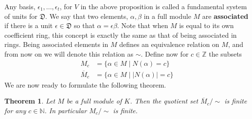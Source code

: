 \documentclass{article}
\newtheorem{theorem}{Theorem}[section]
\newcommand{\mfrak}[1]{\mathfrak{#1}}
\newcommand{\mbb}[1]{\mathbb{#1}}
\numberwithin{equation}{section}
\begin{document}
Any basis, $\epsilon_1, ..., \epsilon_t$, for $V$ in the above proposition is called a fundamental system of units for $\mfrak D$. We say that two elements, $\alpha,\beta$ in a full module $M$ are \textbf{associated} if there is a unit $\epsilon \in \mfrak D$ so that $\alpha = \epsilon \beta$. Note that when $M$ is equal to its own coefficient ring, this concept is exactly the same as that of being associated in rings. Being associated elements in $M$ defines an equivalence relation on $M$, and from now on we will denote this relation as $\sim$. Define now for $c \in \mbb Z$ the subsets
\begin{align*}
    M_c           & = \{ \alpha \in M \mid N(\alpha) = c\}     \\
    \overline M_c & = \{ \alpha \in M \mid | N(\alpha) | = c\}
\end{align*}
We are now ready to formulate the following theorem.
\begin{theorem}
    Let $M$ be a full module of $K$. Then the quotient set $\overline M_c / \sim$ is finite for any $c \in \mbb N$. In particular $M_c / \sim$ is finite.
\end{theorem}
\end{document}
